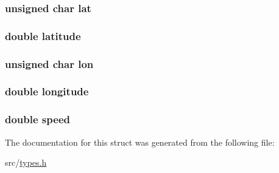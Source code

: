 \subsubsection[{\texorpdfstring{lat}{lat}}]{\setlength{\rightskip}{0pt plus 5cm}unsigned char lat}\hypertarget{structrmc_a6a2e4ad53afd61fcd716002fc2965220}{}\label{structrmc_a6a2e4ad53afd61fcd716002fc2965220}
\subsubsection[{\texorpdfstring{latitude}{latitude}}]{\setlength{\rightskip}{0pt plus 5cm}double latitude}\hypertarget{structrmc_a76714bdbc5c536fa77dfb14533ff82a9}{}\label{structrmc_a76714bdbc5c536fa77dfb14533ff82a9}
\subsubsection[{\texorpdfstring{lon}{lon}}]{\setlength{\rightskip}{0pt plus 5cm}unsigned char lon}\hypertarget{structrmc_a7e55b80071251dcef4239e60122980a4}{}\label{structrmc_a7e55b80071251dcef4239e60122980a4}
\subsubsection[{\texorpdfstring{longitude}{longitude}}]{\setlength{\rightskip}{0pt plus 5cm}double longitude}\hypertarget{structrmc_ac155e35fdeebafc89723a51520fb9fe6}{}\label{structrmc_ac155e35fdeebafc89723a51520fb9fe6}
\subsubsection[{\texorpdfstring{speed}{speed}}]{\setlength{\rightskip}{0pt plus 5cm}double speed}\hypertarget{structrmc_a6dc6e6f3c75c509ce943163afb5dade7}{}\label{structrmc_a6dc6e6f3c75c509ce943163afb5dade7}


The documentation for this struct was generated from the following file\+:\begin{DoxyCompactItemize}
\item 
src/\hyperlink{types_8h}{types.\+h}\end{DoxyCompactItemize}
